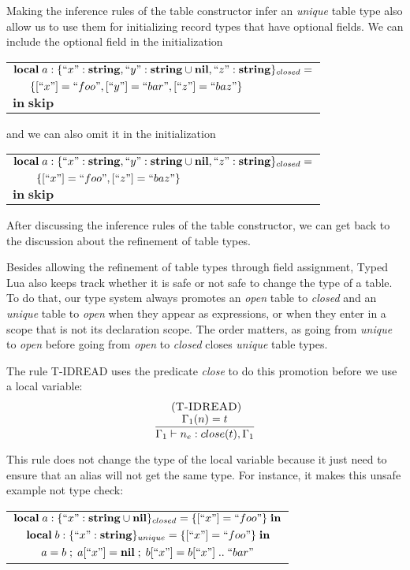 Making the inference rules of the table constructor infer an \emph{unique}
table type also allow us to use them for initializing record types that
have optional fields.
We can include the optional field in the initialization
\begin{center}
\begin{tabular}{ll}
\multicolumn{2}{l}{$\mathbf{local} \; a:\{``x":\mathbf{string}, ``y":\mathbf{string} \cup \mathbf{nil}, ``z":\mathbf{string}\}_{closed} =$}\\
& \multicolumn{1}{l}{$\{ [``x"] = ``foo", [``y"] = ``bar", [``z"] = ``baz" \}$}\\
\multicolumn{2}{l}{$\mathbf{in} \; \mathbf{skip}$}
\end{tabular}
\end{center}
and we can also omit it in the initialization
\begin{center}
\begin{tabular}{ll}
\multicolumn{2}{l}{$\mathbf{local} \; a:\{``x":\mathbf{string}, ``y":\mathbf{string} \cup \mathbf{nil}, ``z":\mathbf{string}\}_{closed} =$}\\
& \multicolumn{1}{l}{$\{ [``x"] = ``foo", [``z"] = ``baz" \}$}\\
\multicolumn{2}{l}{$\mathbf{in} \; \mathbf{skip}$}
\end{tabular}
\end{center}

After discussing the inference rules of the table constructor,
we can get back to the discussion about the refinement of table types.

Besides allowing the refinement of table types through field assignment,
Typed Lua also keeps track whether it is safe or not safe to change the
type of a table.
To do that, our type system always promotes an \emph{open}
table to \emph{closed} and an \emph{unique} table to \emph{open}
when they appear as expressions, or when they enter in a scope that is
not its declaration scope.
The order matters, as going from \emph{unique} to \emph{open}
before going from \emph{open} to \emph{closed} closes \emph{unique} table types.

The rule \textsc{T-IDREAD} uses the predicate \emph{close} to do
this promotion before we use a local variable:
\[
\begin{array}{c}
\; (\textsc{T-IDREAD})\\
\dfrac{\Gamma_{1}(n) = t}
      {\Gamma_{1} \vdash n_{e}:close(t), \Gamma_{1}}
\end{array}
\]

This rule does not change the type of the local variable because it
just need to ensure that an alias will not get the same type.
For instance, it makes this unsafe example not type check:
\begin{center}
\begin{tabular}{lll}
\multicolumn{3}{l}{$\mathbf{local} \; a:\{``x":\mathbf{string} \cup \mathbf{nil}\}_{closed} = \{ [``x"] = ``foo" \} \; \mathbf{in}$}\\
& \multicolumn{2}{l}{$\mathbf{local} \; b:\{``x":\mathbf{string} \}_{unique} = \{ [``x"] = ``foo" \} \; \mathbf{in}$}\\
& & \multicolumn{1}{l}{$a = b \;;\; a[``x"] = \mathbf{nil} \;;\; b[``x"] = b[``x"] \;{..}\; ``bar"$}
\end{tabular}
\end{center}


